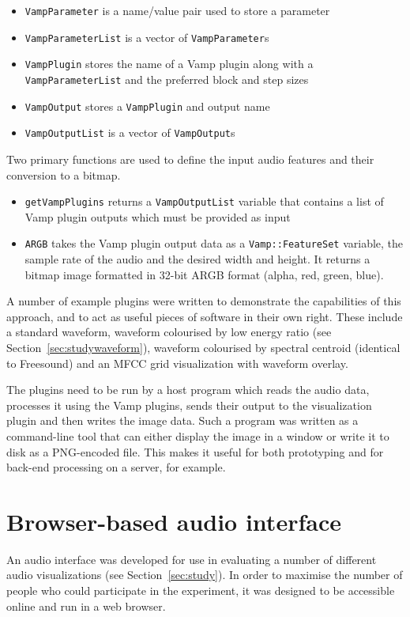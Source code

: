 {\singlespacing
\begin{itemize}
  \item \texttt{VampParameter} is a name/value pair used to store a parameter
  \item \texttt{VampParameterList} is a vector of \texttt{VampParameter}s
  \item \texttt{VampPlugin} stores the name of a Vamp plugin along with a
    \texttt{VampParameterList} and the preferred block and step sizes
  \item \texttt{VampOutput} stores a \texttt{VampPlugin} and output name
  \item \texttt{VampOutputList} is a vector of \texttt{VampOutput}s
\end{itemize}
}

Two primary functions are used to define the input audio features and their
conversion to a bitmap.

\begin{itemize}
  \item \texttt{getVampPlugins} returns a \texttt{VampOutputList} variable
    that contains a list of Vamp plugin outputs which must be provided as
    input
  \item \texttt{ARGB} takes the Vamp plugin output data as a
    \texttt{Vamp::FeatureSet} variable, the sample rate of the audio and the
    desired width and height. It returns a bitmap image formatted in 32-bit
    ARGB format (alpha, red, green, blue).
\end{itemize}

A number of example plugins were written to demonstrate the capabilities of
this approach, and to act as useful pieces of software in their own right.
These include a standard waveform, waveform colourised by low energy ratio (see
Section~\ref{sec:studywaveform}), waveform colourised by spectral centroid
(identical to Freesound) and an MFCC grid visualization with waveform overlay.

The plugins need to be run by a host program which reads the audio data,
processes it using the Vamp plugins, sends their output to the visualization
plugin and then writes the image data. Such a program was written as a
command-line tool that can either display the image in a window or write it to
disk as a PNG-encoded file. This makes it useful for both prototyping and for
back-end processing on a server, for example.

\section{Browser-based audio interface}\label{sec:iface}
An audio interface was developed for use in evaluating a number of different
audio visualizations (see Section~\ref{sec:study}). In order to maximise the
number of people who could participate in the experiment, it was designed to be
accessible online and run in a web browser.

